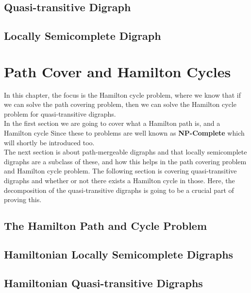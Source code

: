 \section{Quasi-transitive Digraph}
\label{sec:quasi}

\section{Locally Semicomplete Digraph}
\label{sec:locally}


\chapter{Path Cover and Hamilton Cycles}
\label{chap:Hamilton}
In this chapter, the focus is the Hamilton cycle problem, where we know that if we can solve the path covering problem, then we can solve the Hamilton cycle problem for quasi-transitive digraphs.\\
In the first section we are going to cover what a Hamilton path is, and a Hamilton cycle Since these to problems are well known as \textbf{NP-Complete} which will shortly be introduced too.\\
The next section is about path-mergeable digraphs and that locally semicomplete digraphs are a subclass of these, and how this helps in the path covering problem and Hamilton cycle problem. 
The following section is covering quasi-transitive digraphs and whether or not there exists a Hamilton cycle in those. 
Here, the decomposition of the quasi-transitive digraphs is going to be a crucial part of proving this. \\


\section{The Hamilton Path and Cycle Problem}
\label{sec:hNP}

\section{Hamiltonian Locally Semicomplete Digraphs}
\label{sec:hlocally}

\section{Hamiltonian Quasi-transitive Digraphs}
\label{sec:hquasi}

